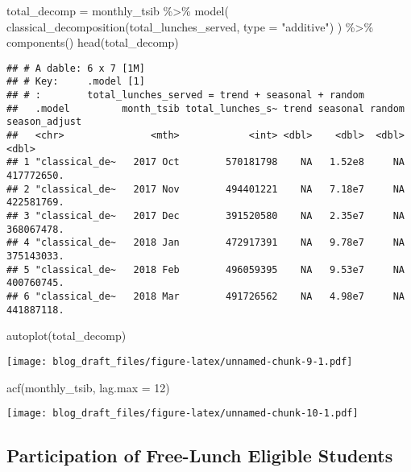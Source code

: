 \documentclass[
]{article}
\newenvironment{Shaded}{\begin{snugshade}}{\end{snugshade}}
\newcommand{\AttributeTok}[1]{\textcolor[rgb]{0.77,0.63,0.00}{#1}}
\newcommand{\DecValTok}[1]{\textcolor[rgb]{0.00,0.00,0.81}{#1}}
\newcommand{\FunctionTok}[1]{\textcolor[rgb]{0.00,0.00,0.00}{#1}}
\newcommand{\NormalTok}[1]{#1}
\newcommand{\OtherTok}[1]{\textcolor[rgb]{0.56,0.35,0.01}{#1}}
\newcommand{\SpecialCharTok}[1]{\textcolor[rgb]{0.00,0.00,0.00}{#1}}
\newcommand{\StringTok}[1]{\textcolor[rgb]{0.31,0.60,0.02}{#1}}
\begin{document}
\begin{Shaded}
\begin{Highlighting}[]
\NormalTok{total\_decomp }\OtherTok{=}\NormalTok{ monthly\_tsib }\SpecialCharTok{\%\textgreater{}\%} 
  \FunctionTok{model}\NormalTok{(}
    \FunctionTok{classical\_decomposition}\NormalTok{(total\_lunches\_served, }\AttributeTok{type =} \StringTok{"additive"}\NormalTok{)}
\NormalTok{  ) }\SpecialCharTok{\%\textgreater{}\%} 
  \FunctionTok{components}\NormalTok{()}
\FunctionTok{head}\NormalTok{(total\_decomp)}
\end{Highlighting}
\end{Shaded}

\begin{verbatim}
## # A dable: 6 x 7 [1M]
## # Key:     .model [1]
## # :        total_lunches_served = trend + seasonal + random
##   .model         month_tsib total_lunches_s~ trend seasonal random season_adjust
##   <chr>               <mth>            <int> <dbl>    <dbl>  <dbl>         <dbl>
## 1 "classical_de~   2017 Oct        570181798    NA   1.52e8     NA    417772650.
## 2 "classical_de~   2017 Nov        494401221    NA   7.18e7     NA    422581769.
## 3 "classical_de~   2017 Dec        391520580    NA   2.35e7     NA    368067478.
## 4 "classical_de~   2018 Jan        472917391    NA   9.78e7     NA    375143033.
## 5 "classical_de~   2018 Feb        496059395    NA   9.53e7     NA    400760745.
## 6 "classical_de~   2018 Mar        491726562    NA   4.98e7     NA    441887118.
\end{verbatim}

\begin{Shaded}
\begin{Highlighting}[]
\FunctionTok{autoplot}\NormalTok{(total\_decomp)}
\end{Highlighting}
\end{Shaded}

\texttt{[image: blog\_draft\_files/figure-latex/unnamed-chunk-9-1.pdf]}

\begin{Shaded}
\begin{Highlighting}[]
\FunctionTok{acf}\NormalTok{(monthly\_tsib, }\AttributeTok{lag.max =} \DecValTok{12}\NormalTok{)}
\end{Highlighting}
\end{Shaded}

\texttt{[image: blog\_draft\_files/figure-latex/unnamed-chunk-10-1.pdf]}

\hypertarget{participation-of-free-lunch-eligible-students}{%
\subsection{Participation of Free-Lunch Eligible
Students}\label{participation-of-free-lunch-eligible-students}}
\end{document}
